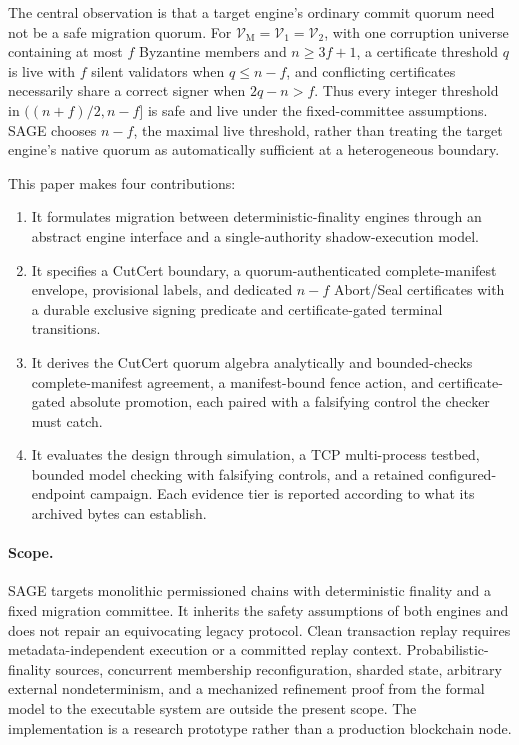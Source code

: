 \documentclass[journal]{IEEEtran}
\theoremstyle{definition}
\theoremstyle{remark}
\begin{document}
The central observation is that a target engine's ordinary commit quorum need not be a safe
migration quorum. For $\mathcal{V}_{\mathrm M}=\mathcal{V}_1=\mathcal{V}_2$, with one corruption
universe containing at most $f$ Byzantine members and $n\ge 3f+1$, a certificate threshold $q$ is live with $f$
silent validators when $q\le n-f$, and conflicting certificates necessarily share a correct signer
when $2q-n>f$. Thus every integer threshold in $((n+f)/2,n-f]$ is safe and live under the
fixed-committee assumptions. SAGE chooses $n-f$, the maximal live threshold, rather than treating
the target engine's native quorum as automatically sufficient at a heterogeneous boundary.

This paper makes four contributions:
\begin{enumerate}
  \item It formulates migration between deterministic-finality engines through an abstract engine
  interface and a single-authority shadow-execution model.
  \item It specifies a CutCert boundary, a quorum-authenticated complete-manifest envelope,
  provisional labels, and dedicated $n-f$ Abort/Seal certificates with a durable exclusive signing
  predicate and certificate-gated terminal transitions.
  \item It derives the CutCert quorum algebra analytically and bounded-checks complete-manifest
  agreement, a manifest-bound fence action, and certificate-gated absolute promotion, each paired
  with a falsifying control the checker must catch.
  \item It evaluates the design through simulation, a TCP multi-process testbed, bounded model
  checking with falsifying controls, and a retained configured-endpoint campaign. Each evidence
  tier is reported according to what its archived bytes can establish.
\end{enumerate}

\paragraph{Scope.}
SAGE targets monolithic permissioned chains with deterministic finality and a fixed migration
committee. It inherits the safety assumptions of both engines and does not repair an equivocating
legacy protocol. Clean transaction replay requires metadata-independent execution or a committed
replay context. Probabilistic-finality sources, concurrent membership reconfiguration, sharded
state, arbitrary external nondeterminism, and a mechanized refinement proof from the formal model
to the executable system are outside the present scope. The implementation is a research prototype rather than a
production blockchain node.
\end{document}
